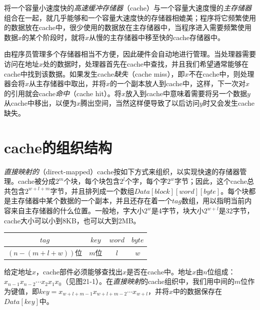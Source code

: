 \documentclass[cn,11pt,chinese]{elegantbook}
\begin{document}
将一个容量小速度快的\textit{高速缓冲存储器}（cache）与一个容量大速度慢的\textit{主存储器}组合在一起，就几乎能够和一个容量大速度快的存储器相媲美；程序将它频繁使用的数据放在cache中，很少使用的数据放在主存储器中，当程序进入需要频繁使用数据$x$的某个阶段时，就将$x$从慢的主存储器中移至快的cache存储器中。

由程序员管理多个存储器相当不方便，因此硬件会自动地进行管理。当处理器需要访问在地址$x$处的数据时，处理器首先在cache中查找，并且我们希望通常能够在cache中找到该数据。如果发生cache\textit{缺失}（cache miss），即$x$不在cache中，则处理器会将$x$从主存储器中取出，并将$x$的一个副本放人到cache中，这样，下一次对$x$的引用就会cache\textit{命中}（cache hit）。将$x$放入到cache中意味着需要将另一个数据$y$从cache中移出，以便为$x$腾出空间，当然这样便导致了以后访问$y$时又会发生cache缺失。

\section{cache的组织结构}

\textit{直接映射的}（direct-mapped）cache按如下方式来组织，以实现快速的存储器管理。cache被分成$2^m$个块，每个块包含$2^l$个字，每个字$2^w$字节；因此，这个cache总共包含$2^{w+l+m}$字节，并且排列成一个数组$Data[block][word][byte]$。每个块都是主存储器中某个数据的一个副本，并且还存在着一个$tag$数组，用以指明当前内容来自主存储器的什么位置。一般地，字大小$2^w$是4字节，块大小$2^{w+l}$是32字节，cache大小可以小到8KB，也可以大到2MB。

\begin{center}
\begin{tabular}{|c|c|c|c|}
  \hline
  $tag$ & $key$ & $word$ & $byte$ \\
  \hline
  \multicolumn{1}{c}{$(n-(m+l+w))$位} & \multicolumn{1}{c}{$m$位} & \multicolumn{1}{c}{$l$} & \multicolumn{1}{c}{$w$} \\
\end{tabular}
\end{center}

给定地址$x$，cache部件必须能够查找出$x$是否在cache中。地址$x$由$n$位组成：$x_{n-1}x_{n-2}\cdots x_2x_1x_0$（见图21-1）。在\textit{直接映射}的cache组织中，我们用中间的$m$位作为键值，即$key=x_{w+l+m-1}x_{w+l+m-2}\cdots x_{w+l}$，并将$x$中的数据保存在$Data[key]$中。
\end{document}
